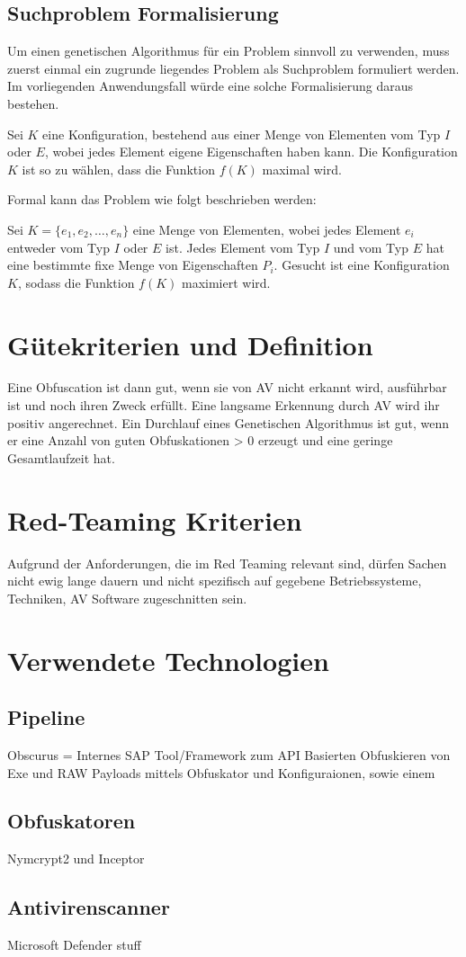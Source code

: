     \subsection{Suchproblem Formalisierung}
    Um einen genetischen Algorithmus für ein Problem sinnvoll zu verwenden, muss zuerst einmal ein zugrunde liegendes Problem als Suchproblem formuliert werden. Im vorliegenden Anwendungsfall würde eine solche Formalisierung daraus bestehen.

Sei $K$ eine Konfiguration, bestehend aus einer Menge von Elementen vom Typ $I$ oder $E$, wobei jedes Element eigene Eigenschaften haben kann. Die Konfiguration $K$ ist so zu wählen, dass die Funktion $f(K)$ maximal wird.

Formal kann das Problem wie folgt beschrieben werden:

Sei $K = \{e_1, e_2, \ldots, e_n\}$ eine Menge von Elementen, wobei jedes Element $e_i$ entweder vom Typ $I$ oder $E$ ist. Jedes Element vom Typ $I$ und vom Typ $E$ hat eine bestimmte fixe Menge von Eigenschaften $P_i$. Gesucht ist eine Konfiguration $K$, sodass die Funktion $f(K)$ maximiert wird.

\begin{comment}

\end{comment}
\section{Gütekriterien und Definition}
Eine Obfuscation ist dann gut, wenn sie von AV nicht erkannt wird, ausführbar ist und noch ihren Zweck erfüllt. Eine langsame Erkennung durch AV wird ihr positiv angerechnet. Ein Durchlauf eines Genetischen Algorithmus ist gut, wenn er eine Anzahl von guten Obfuskationen > 0 erzeugt und eine geringe Gesamtlaufzeit hat.
\section{Red-Teaming Kriterien}
Aufgrund der Anforderungen, die im Red Teaming relevant sind, dürfen Sachen nicht ewig lange dauern und nicht spezifisch auf gegebene Betriebssysteme, Techniken, AV Software zugeschnitten sein.

\section{Verwendete Technologien}
    \subsection{Pipeline}
    Obscurus = Internes SAP Tool/Framework zum API Basierten Obfuskieren von Exe und RAW Payloads mittels Obfuskator und Konfiguraionen, sowie einem 
    \subsection{Obfuskatoren}
    Nymcrypt2 und Inceptor
    \subsection{Antivirenscanner}
    Microsoft Defender stuff
